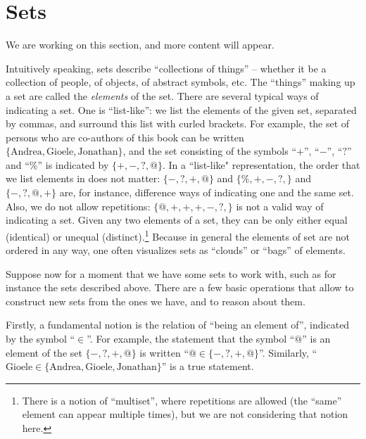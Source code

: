 

\section{Sets}
We are working on this section, and more content will appear.




Intuitively speaking, sets describe ``collections of things'' -- whether it be a collection of people, of objects, of abstract symbols, etc.  The ``things'' making up a set are called the \emph{elements} of the set. There are several typical ways of indicating a set. One is ``list-like'':   we list the elements of the given set, separated by commas, and surround this list with curled brackets. For example, the set of persons who are co-authors of this book can be written $\{ \text{Andrea}, \text{Gioele}, \text{Jonathan} \}$, and the set consisting of the symbols ``$+$'', ``$-$'', ``$?$'' and ``$\%$'' is indicated by $\{ +, -, ?, @ \}$. In a ``list-like" representation, the order that we list elements in does not matter: $\{ -, ?, +, @ \}$ and $\{ \%, +, -, ?, \}$ and $\{ -, ?, @, + \}$ are, for instance, difference ways of indicating one and the same set. Also, we do not allow repetitions: $\{ @, +, +, +, -, ?, \}$ is not a valid way of indicating a set. Given any two elements of a set, they can be only either equal (identical) or unequal (distinct).\footnote{There is a notion of ``multiset'', where repetitions are allowed (the ``same'' element can appear multiple times), but we are not considering that notion here.} Because in general the elements of set are not ordered in any way, one often visualizes sets as ``clouds'' or ``bags'' of elements. 




Suppose now for a moment that we have some sets to work with, such as for instance the sets described above.
There are a few basic operations that allow to construct new sets from the ones we have, and to reason about them.


Firstly, a fundamental notion is the relation of ``being an element of'', indicated by the symbol ``$\in$''.
For example, the statement that the symbol ``$@$'' is an element of the set $\{ -, ?, +, @ \}$ is written ``$@ \in \{ -, ?, +, @ \}$''.
Similarly, ``$\text{Gioele} \in \{ \text{Andrea}, \text{Gioele}, \text{Jonathan} \}$'' is a true statement.

